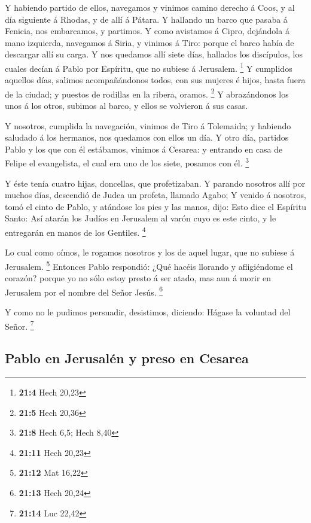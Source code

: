  Y habiendo partido de ellos, navegamos y vinimos camino
derecho á Coos, y al día siguiente á Rhodas, y de allí á Pátara.
 Y hallando un barco que pasaba á Fenicia, nos embarcamos,
y partimos.  Y como avistamos á Cipro, dejándola á mano
izquierda, navegamos á Siria, y vinimos á Tiro: porque el barco había de
descargar allí su carga.  Y nos quedamos allí siete días,
hallados los discípulos, los cuales decían á Pablo por Espíritu, que no
subiese á Jerusalem. \footnote{\textbf{21:4} Hech 20,23} 
Y cumplidos aquellos días, salimos acompañándonos todos, con sus mujeres
é hijos, hasta fuera de la ciudad; y puestos de rodillas en la ribera,
oramos. \footnote{\textbf{21:5} Hech 20,36}  Y
abrazándonos los unos á los otros, subimos al barco, y ellos se
volvieron á sus casas.

 Y nosotros, cumplida la navegación, vinimos de Tiro á
Tolemaida; y habiendo saludado á los hermanos, nos quedamos con ellos un
día.  Y otro día, partidos Pablo y los que con él
estábamos, vinimos á Cesarea: y entrando en casa de Felipe el
evangelista, el cual era uno de los siete, posamos con él. \footnote{\textbf{21:8}
  Hech 6,5; Hech 8,40}

 Y éste tenía cuatro hijas, doncellas, que profetizaban.
 Y parando nosotros allí por muchos días, descendió de
Judea un profeta, llamado Agabo;  Y venido á nosotros,
tomó el cinto de Pablo, y atándose los pies y las manos, dijo: Esto dice
el Espíritu Santo: Así atarán los Judíos en Jerusalem al varón cuyo es
este cinto, y le entregarán en manos de los Gentiles. \footnote{\textbf{21:11}
  Hech 20,23}

 Lo cual como oímos, le rogamos nosotros y los de aquel
lugar, que no subiese á Jerusalem. \footnote{\textbf{21:12} Mat 16,22}
 Entonces Pablo respondió: ¿Qué hacéis llorando y
afligiéndome el corazón? porque yo no sólo estoy presto á ser atado, mas
aun á morir en Jerusalem por el nombre del Señor Jesús. \footnote{\textbf{21:13}
  Hech 20,24}

 Y como no le pudimos persuadir, desistimos, diciendo:
Hágase la voluntad del Señor. \footnote{\textbf{21:14} Luc 22,42}

\hypertarget{pablo-en-jerusaluxe9n-y-preso-en-cesarea}{%
\subsection{Pablo en Jerusalén y preso en
Cesarea}\label{pablo-en-jerusaluxe9n-y-preso-en-cesarea}}

